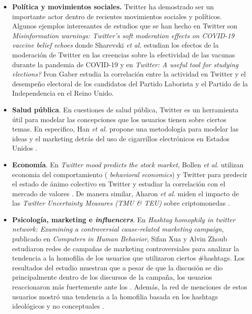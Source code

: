 \begin{itemize}

    \item \textbf{Política y movimientos sociales.} Twitter ha demostrado ser un importante actor dentro de recientes movimientos sociales y políticos. Algunos ejemplos interesantes de estudios que se han hecho en Twitter son \textit{Misinformation warnings: Twitter’s soft moderation effects on COVID-19 vaccine belief echoes} donde Sharevski \textit{et al.} estudian los efectos de la moderación de Twitter en las creencias sobre la efectividad de las vacunas durante la pandemia de COVID-19 \cite{sharevski_misinformation_2022} y en \textit{Twitter: A useful tool for studying elections?} Ivon Gaber estudia la correlación entre la actividad en Twitter y el desempeño electoral de los candidatos del Partido Laborista y el Partido de la Independencia en el Reino Unido. \cite{gaber_twitter_2017}

    \item \textbf{Salud pública}. En cuestiones de salud pública, Twitter es un herramienta útil para modelar las concepciones que los usuarios tienen sobre ciertos temas. En especifico, Han \textit{et al.} propone una metodología para modelar las ideas y el marketing detrás del uso de cigarrillos electrónicos en Estados Unidos \cite{spiro_exploratory_2016}.

    \item \textbf{Economía}. En \textit{Twitter mood predicts the stock market}, Bollen \textit{et al.} utilizan economia del comportamiento (\textit{ behavioral economics}) y Twitter para predecir el estado de ánimo colectivo en Twitter y estudiar la correlación con el mercado de valores \cite{bollen_twitter_2011}. De manera similar, Aharon \textit{et al.} miden el impacto de las \textit{Twitter Uncertainty Measures (TMU \& TEU)} sobre criptomonedas \cite{aharon_twitter-based_2022}.

    \item \textbf{Psicología, marketing e \textit{influencers}}. En \textit{Hashtag homophily in twitter network: Examining a controversial cause-related marketing campaign}, publicado en \textit{Computers in Human Behavior}, Sifan Xua y Alvin Zhoub estudiaron redes de campañas de marketing controversiales para analizar la tendencia a la homofilia de los usuarios que utilizaron ciertos \#hashtags. Los resultados del estudio muestran que a pesar de que la discusión se dio principalmente dentro de los discursos de la campaña, los usuarios reaccionaron más fuertemente ante los . Además, la red de menciones de estos usuarios mostró una tendencia a la homofilia basada en los hashtags ideológicos y no conceptuales \cite{xu_hashtag_2020}.


\end{itemize}

